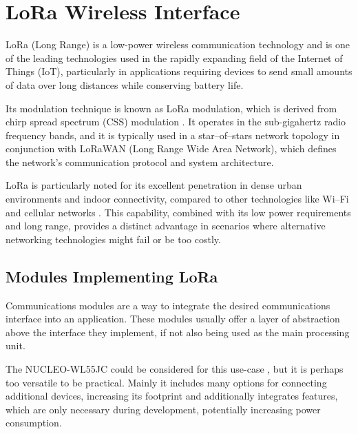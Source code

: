 \section{LoRa Wireless Interface}
LoRa (Long Range) is a low-power wireless communication technology and is one of the leading technologies used in the rapidly expanding field of the Internet of Things (IoT), particularly in applications requiring devices to send small amounts of data over long distances while conserving battery life.

Its modulation technique is known as LoRa modulation, which is derived from chirp spread spectrum (CSS) modulation \cite{semtech_corporation_sx12612_2024}. It operates in the sub-gigahertz radio frequency bands, and it is typically used in a star--of--stars network topology in conjunction with LoRaWAN (Long Range Wide Area Network), which defines the network's communication protocol and system architecture.

LoRa is particularly noted for its excellent penetration in dense urban environments and indoor connectivity, compared to other technologies like Wi--Fi and cellular networks \cite{stmicroelectronics_lora_2024,semtech_corporation_sx12612_2024,seeedstudio_wio-e5-wireless_2024}. This capability, combined with its low power requirements and long range, provides a distinct advantage in scenarios where alternative networking technologies might fail or be too costly.

\subsection{Modules Implementing LoRa}
Communications modules are a way to integrate the desired communications interface into an application. These modules usually offer a layer of abstraction above the interface they implement, if not also being used as the main processing unit.

The NUCLEO-WL55JC could be considered for this use-case \cite{stmicroelectronics_nucleo-wl55jc_2024}, but it is perhaps too versatile to be practical. Mainly it includes many options for connecting additional devices, increasing its footprint and additionally integrates features, which are only necessary during development, potentially increasing power consumption.

